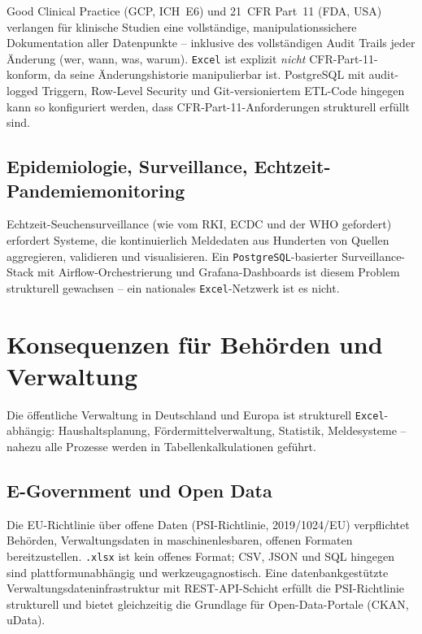 \documentclass[12pt,a4paper]{report}
\theoremstyle{definition}
\theoremstyle{remark}
\newcommand{\excel}{\texttt{Excel}}
\newcommand{\pg}{\texttt{PostgreSQL}}
\newcommand{\code}[1]{\texttt{#1}}
\begin{document}
Good Clinical Practice (GCP, ICH~E6) und 21~CFR Part~11 (FDA, USA)
verlangen für klinische Studien eine vollständige,
manipulationssichere Dokumentation aller Datenpunkte -- inklusive
des vollständigen Audit Trails jeder Änderung (wer, wann, was, warum).
\excel{} ist explizit \emph{nicht} CFR-Part-11-konform, da seine
Änderungshistorie manipulierbar ist.
PostgreSQL mit audit-logged Triggern, Row-Level Security und
Git-versioniertem ETL-Code hingegen kann so konfiguriert werden,
dass CFR-Part-11-Anforderungen strukturell erfüllt sind.

\subsection{Epidemiologie, Surveillance, Echtzeit-Pandemiemonitoring}

Echtzeit-Seuchensurveillance (wie vom RKI, ECDC und der WHO gefordert)
erfordert Systeme, die kontinuierlich Meldedaten aus Hunderten von
Quellen aggregieren, validieren und visualisieren.
Ein \pg-basierter Surveillance-Stack mit Airflow-Orchestrierung und
Grafana-Dashboards ist diesem Problem strukturell gewachsen --
ein nationales \excel-Netzwerk ist es nicht.

\section{Konsequenzen für Behörden und Verwaltung}

Die öffentliche Verwaltung in Deutschland und Europa ist strukturell
\excel-abhängig: Haushaltsplanung, Fördermittelverwaltung, Statistik,
Meldesysteme -- nahezu alle Prozesse werden in Tabellenkalkulationen
geführt.

\subsection{E-Government und Open Data}

Die EU-Richtlinie über offene Daten (PSI-Richtlinie,
2019/1024/EU) verpflichtet Behörden, Verwaltungsdaten in
maschinenlesbaren, offenen Formaten bereitzustellen.
\code{.xlsx} ist kein offenes Format; CSV, JSON und SQL hingegen sind
plattformunabhängig und werkzeugagnostisch.
Eine datenbankgestützte Verwaltungsdateninfrastruktur mit REST-API-Schicht
erfüllt die PSI-Richtlinie strukturell und bietet gleichzeitig die
Grundlage für Open-Data-Portale (CKAN, uData).
\end{document}
